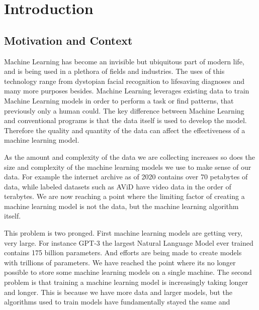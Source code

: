 
\section{Introduction}

\subsection{Motivation and Context}

Machine Learning has become an invisible but ubiquitous part of modern life, and
is being used in a plethora of fields and industries. The uses of this
technology range from dystopian facial recognition
\cite{mattBurgessFacialRecognision} to lifesaving diagnoses
\cite{Mammograms2020} and many more purposes besides. Machine Learning leverages
existing data to train Machine Learning models in order to perform a task or
find patterns, that previously only a human could. The key difference between
Machine Learning and conventional programs is that the data itself is used to
develop the model. Therefore the quality and quantity of the data can affect the
effectiveness of a machine learning model.
\par
As the amount and complexity of the data we are collecting increases so does the
size and complexity of the machine learning models we use to make sense of our
data. For example the internet archive as of 2020 contains over 70 petabytes of
data, while labeled datasets such as AViD have video data in the order of
terabytes. \cite{piergiovanni2020avid} We are now reaching a point where the
limiting factor of creating a machine learning model is not the data, but the
machine learning algorithm itself.
\par
This problem is two pronged. First machine learning models are getting very,
very large. For instance GPT-3 the largest Natural Language Model ever trained
contains 175 billion parameters. \cite{fewshowlearners2020gpt} And efforts are
being made to create models with trillions of parameters.
\cite{rajbhandari2020zero} We have reached the point where its no longer
possible to store some machine learning models on a single
machine.\cite{LI2014ParameterServers}
The second problem is that training a machine learning model is increasingly
taking longer and longer. This is because we have more data and larger models,
but the algorithms used to train models have fundamentally stayed the same and
